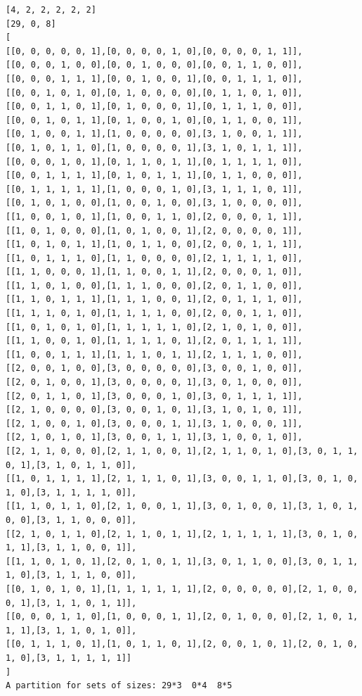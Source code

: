 \documentclass[final]{dmtcs-episciences}
\begin{document}
\begin{appendices}
\begin{verbatim} 
[4, 2, 2, 2, 2, 2]
[29, 0, 8]
[
[[0, 0, 0, 0, 0, 1],[0, 0, 0, 0, 1, 0],[0, 0, 0, 0, 1, 1]],
[[0, 0, 0, 1, 0, 0],[0, 0, 1, 0, 0, 0],[0, 0, 1, 1, 0, 0]],
[[0, 0, 0, 1, 1, 1],[0, 0, 1, 0, 0, 1],[0, 0, 1, 1, 1, 0]],
[[0, 0, 1, 0, 1, 0],[0, 1, 0, 0, 0, 0],[0, 1, 1, 0, 1, 0]],
[[0, 0, 1, 1, 0, 1],[0, 1, 0, 0, 0, 1],[0, 1, 1, 1, 0, 0]],
[[0, 0, 1, 0, 1, 1],[0, 1, 0, 0, 1, 0],[0, 1, 1, 0, 0, 1]],
[[0, 1, 0, 0, 1, 1],[1, 0, 0, 0, 0, 0],[3, 1, 0, 0, 1, 1]],
[[0, 1, 0, 1, 1, 0],[1, 0, 0, 0, 0, 1],[3, 1, 0, 1, 1, 1]],
[[0, 0, 0, 1, 0, 1],[0, 1, 1, 0, 1, 1],[0, 1, 1, 1, 1, 0]],
[[0, 0, 1, 1, 1, 1],[0, 1, 0, 1, 1, 1],[0, 1, 1, 0, 0, 0]],
[[0, 1, 1, 1, 1, 1],[1, 0, 0, 0, 1, 0],[3, 1, 1, 1, 0, 1]],
[[0, 1, 0, 1, 0, 0],[1, 0, 0, 1, 0, 0],[3, 1, 0, 0, 0, 0]],
[[1, 0, 0, 1, 0, 1],[1, 0, 0, 1, 1, 0],[2, 0, 0, 0, 1, 1]],
[[1, 0, 1, 0, 0, 0],[1, 0, 1, 0, 0, 1],[2, 0, 0, 0, 0, 1]],
[[1, 0, 1, 0, 1, 1],[1, 0, 1, 1, 0, 0],[2, 0, 0, 1, 1, 1]],
[[1, 0, 1, 1, 1, 0],[1, 1, 0, 0, 0, 0],[2, 1, 1, 1, 1, 0]],
[[1, 1, 0, 0, 0, 1],[1, 1, 0, 0, 1, 1],[2, 0, 0, 0, 1, 0]],
[[1, 1, 0, 1, 0, 0],[1, 1, 1, 0, 0, 0],[2, 0, 1, 1, 0, 0]],
[[1, 1, 0, 1, 1, 1],[1, 1, 1, 0, 0, 1],[2, 0, 1, 1, 1, 0]],
[[1, 1, 1, 0, 1, 0],[1, 1, 1, 1, 0, 0],[2, 0, 0, 1, 1, 0]],
[[1, 0, 1, 0, 1, 0],[1, 1, 1, 1, 1, 0],[2, 1, 0, 1, 0, 0]],
[[1, 1, 0, 0, 1, 0],[1, 1, 1, 1, 0, 1],[2, 0, 1, 1, 1, 1]],
[[1, 0, 0, 1, 1, 1],[1, 1, 1, 0, 1, 1],[2, 1, 1, 1, 0, 0]],
[[2, 0, 0, 1, 0, 0],[3, 0, 0, 0, 0, 0],[3, 0, 0, 1, 0, 0]],
[[2, 0, 1, 0, 0, 1],[3, 0, 0, 0, 0, 1],[3, 0, 1, 0, 0, 0]],
[[2, 0, 1, 1, 0, 1],[3, 0, 0, 0, 1, 0],[3, 0, 1, 1, 1, 1]],
[[2, 1, 0, 0, 0, 0],[3, 0, 0, 1, 0, 1],[3, 1, 0, 1, 0, 1]],
[[2, 1, 0, 0, 1, 0],[3, 0, 0, 0, 1, 1],[3, 1, 0, 0, 0, 1]],
[[2, 1, 0, 1, 0, 1],[3, 0, 0, 1, 1, 1],[3, 1, 0, 0, 1, 0]],
[[2, 1, 1, 0, 0, 0],[2, 1, 1, 0, 0, 1],[2, 1, 1, 0, 1, 0],[3, 0, 1, 1, 0, 1],[3, 1, 0, 1, 1, 0]],
[[1, 0, 1, 1, 1, 1],[2, 1, 1, 1, 0, 1],[3, 0, 0, 1, 1, 0],[3, 0, 1, 0, 1, 0],[3, 1, 1, 1, 1, 0]],
[[1, 1, 0, 1, 1, 0],[2, 1, 0, 0, 1, 1],[3, 0, 1, 0, 0, 1],[3, 1, 0, 1, 0, 0],[3, 1, 1, 0, 0, 0]],
[[2, 1, 0, 1, 1, 0],[2, 1, 1, 0, 1, 1],[2, 1, 1, 1, 1, 1],[3, 0, 1, 0, 1, 1],[3, 1, 1, 0, 0, 1]],
[[1, 1, 0, 1, 0, 1],[2, 0, 1, 0, 1, 1],[3, 0, 1, 1, 0, 0],[3, 0, 1, 1, 1, 0],[3, 1, 1, 1, 0, 0]],
[[0, 1, 0, 1, 0, 1],[1, 1, 1, 1, 1, 1],[2, 0, 0, 0, 0, 0],[2, 1, 0, 0, 0, 1],[3, 1, 1, 0, 1, 1]],
[[0, 0, 0, 1, 1, 0],[1, 0, 0, 0, 1, 1],[2, 0, 1, 0, 0, 0],[2, 1, 0, 1, 1, 1],[3, 1, 1, 0, 1, 0]],
[[0, 1, 1, 1, 0, 1],[1, 0, 1, 1, 0, 1],[2, 0, 0, 1, 0, 1],[2, 0, 1, 0, 1, 0],[3, 1, 1, 1, 1, 1]]
]
A partition for sets of sizes: 29*3  0*4  8*5
\end{verbatim}
\newpage


\end{appendices}
\end{document}
